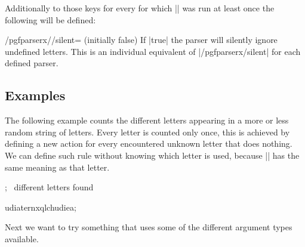 Additionally to those keys for every  for which
|\pgfparserxdef| was run at least once the following will be defined:

\begin{key}
  {/pgfparserx//silent= (initially false)}
  If |true| the parser  will silently ignore undefined
  letters. This is an individual equivalent of |/pgfparserx/silent| for each
  defined parser.
\end{key}

\subsection{Examples}
The following example counts the different letters appearing in a more or less
random string of letters. Every letter is counted only once, this is achieved by
defining a new action for every encountered unknown letter that does nothing. We
can define such rule without knowing which letter is used, because
|\pgfparserxtoken| has the same meaning as that letter.
\begin{codeexample}[]
\newcount\mycountx
;{}
  {\pgfparserxtoken{}\advance{}}
  {\the\mycountx\ different letters found}

udiaternxqlchudiea;
\end{codeexample}

Next we want to try something that uses some of the different argument types
available.
